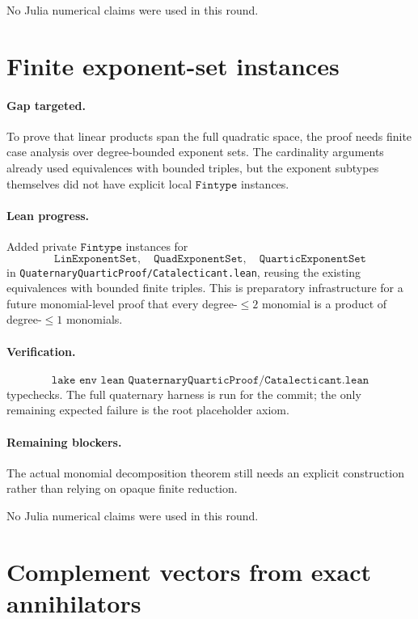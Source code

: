 \documentclass[11pt]{article}
\begin{document}
No Julia numerical claims were used in this round.

\section*{Finite exponent-set instances}

\paragraph{Gap targeted.}
To prove that linear products span the full quadratic space, the proof needs
finite case analysis over degree-bounded exponent sets.  The cardinality
arguments already used equivalences with bounded triples, but the exponent
subtypes themselves did not have explicit local \(\texttt{Fintype}\)
instances.

\paragraph{Lean progress.}
Added private \(\texttt{Fintype}\) instances for
\[
\texttt{LinExponentSet},\quad \texttt{QuadExponentSet},\quad
\texttt{QuarticExponentSet}
\]
in \texttt{QuaternaryQuarticProof/Catalecticant.lean}, reusing the existing
equivalences with bounded finite triples.  This is preparatory infrastructure
for a future monomial-level proof that every degree-\(\le2\) monomial is a
product of degree-\(\le1\) monomials.

\paragraph{Verification.}
\[
\texttt{lake env lean QuaternaryQuarticProof/Catalecticant.lean}
\]
typechecks.  The full quaternary harness is run for the commit; the only
remaining expected failure is the root placeholder axiom.

\paragraph{Remaining blockers.}
The actual monomial decomposition theorem still needs an explicit construction
rather than relying on opaque finite reduction.

No Julia numerical claims were used in this round.

\section*{Complement vectors from exact annihilators}
\end{document}
